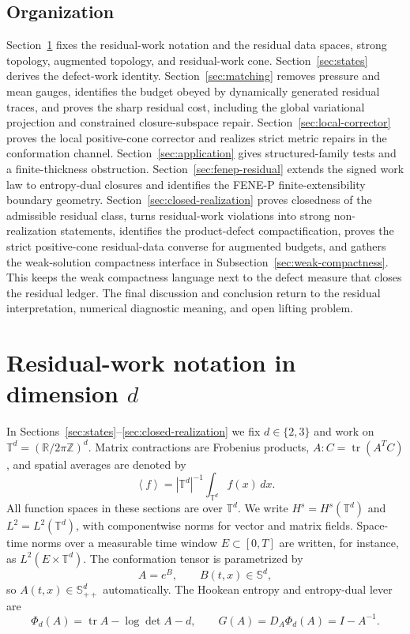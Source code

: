 \documentclass[11pt]{article}
\numberwithin{equation}{section}
\newcommand{\T}{\mathbb T}
\newcommand{\R}{\mathbb R}
\newcommand{\Id}{I}
\newcommand{\Spp}{\mathbb S_{++}}
\newcommand{\Sym}{\mathbb S}
\newcommand{\tr}{\operatorname{tr}}
\newcommand{\avg}[1]{\left\langle #1\right\rangle}
\begin{document}
\subsection*{Organization}
Section~\ref{sec:notation} fixes the residual-work notation and the residual
data spaces, strong topology, augmented topology, and residual-work cone.
Section~\ref{sec:states}
derives the defect-work identity.  Section~\ref{sec:matching} removes pressure
and mean gauges, identifies the budget obeyed by dynamically generated residual
traces, and proves the sharp residual cost, including the global variational
projection and constrained closure-subspace repair.  Section~\ref{sec:local-corrector}
proves the local positive-cone corrector and realizes strict metric repairs in
the conformation channel.  Section~\ref{sec:application}
gives structured-family tests and a finite-thickness obstruction.  Section~\ref{sec:fenep-residual}
extends the signed work law to entropy-dual closures and identifies the FENE-P
finite-extensibility boundary geometry.
Section~\ref{sec:closed-realization} proves closedness of the admissible
residual class, turns residual-work violations into strong non-realization
statements, identifies the product-defect compactification, proves the strict
positive-cone residual-data converse for augmented budgets, and gathers the
weak-solution compactness interface in Subsection~\ref{sec:weak-compactness}.
This keeps the weak compactness language next to the defect measure that closes
the residual ledger.  The final discussion and conclusion return to the
residual interpretation, numerical diagnostic meaning, and open lifting
problem.

\section{Residual-work notation in dimension \texorpdfstring{$d$}{d}}
\label{sec:notation}

In Sections~\ref{sec:states}--\ref{sec:closed-realization} we fix
\(d\in\{2,3\}\) and work on \(\T^d=(\R/2\pi\mathbb Z)^d\).  Matrix
contractions are Frobenius products, \(A:C=\tr(A^TC)\), and spatial averages
are denoted by
\[
  \avg{f}=|\T^d|^{-1}\int_{\T^d}f(x)\,dx .
\]
All function spaces in these sections are over \(\T^d\).  We write
\(H^s=H^s(\T^d)\) and \(L^2=L^2(\T^d)\), with componentwise norms for vector
and matrix fields.  Space-time norms over a measurable time window \(E\subset
[0,T]\) are written, for instance, as \(L^2(E\times\T^d)\).  The conformation
tensor is parametrized by
\[
  A=e^B,
  \qquad
  B(t,x)\in\Sym^d,
\]
so \(A(t,x)\in\Spp^d\) automatically.  The Hookean entropy and entropy-dual
lever are
\[
  \Phi_d(A)=\tr A-\log\det A-d,
  \qquad
  G(A)=D_A\Phi_d(A)=\Id-A^{-1}.
\]
\end{document}
